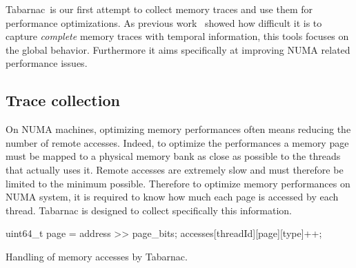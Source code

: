 \acrfull{Tabarnac} is our first attempt to collect memory traces and use them for performance optimizations.
As previous work~\cite{Beniamine13Cartographier} showed how difficult it is to capture \emph{complete} memory traces with temporal information, this tools focuses on the global behavior.
Furthermore it aims specifically at improving \gls{NUMA} related performance issues.

\subsection{Trace collection}

On \gls{NUMA} machines, optimizing memory performances often means reducing the number of remote accesses.
Indeed, to optimize the performances a memory page must be mapped to a physical memory bank as close as possible to the threads that actually uses it.
Remote accesses are extremely slow and must therefore be limited to the minimum possible.
Therefore to optimize memory performances on \gls{NUMA} system, it is required to know how much each page is accessed by each thread.
\gls{Tabarnac} is designed to collect specifically this information.

\begin{algorithm}[htb]
    \begin{algorithmic}
            \State uint64\_t page = address >> page\_bits;
            \State accesses[threadId][page][type]++;
        \EndFunction
    \end{algorithmic}
    \caption{Handling of memory accesses by Tabarnac.}
    \label{alg:Tabarnac}
\end{algorithm}

